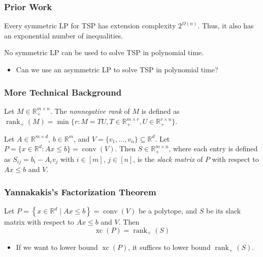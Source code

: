 \documentclass{beamer}
\newcommand{\nrank}{\operatorname{rank}_+}
\newcommand{\conv}{\operatorname{conv}}
\newcommand{\xc}{\operatorname{xc}}
\renewcommand{\R}{\mathbb{R}}
\begin{document}
\begin{frame}
\frametitle{Prior Work}

\pause
\begin{theorem}[Yannakakis, '91]
Every symmetric LP for TSP has extension complexity $2^{\Omega(n)}$. Thus, it also has an exponential number of inequalities.
\end{theorem}

\pause
\begin{corollary}
No symmetric LP can be used to solve TSP in polynomial time.
\end{corollary}

\pause
\begin{itemize}
\item Can we use an asymmetric LP to solve TSP in polynomial time?
\end{itemize}

\end{frame}


\begin{frame}
\frametitle{More Technical Background}

\pause
\begin{definition}
Let $M \in \R_+^{m \times n}$. The \emph{nonnegative rank} of $M$ is defined as $\nrank(M) = \min\{r : M = TU, T \in \R_+^{m \times r}, U \in \R_+^{r \times n}\}$.
\end{definition}

\pause
\begin{definition}
Let $A \in \R^{m \times d}$, $b \in \R^m$, and $V = \{v_1, \ldots, v_n\} \subseteq \R^d$. Let $P = \{x \in \R^d : Ax \le b\} = \conv(V)$. Then $S \in \R_+^{m\times n}$, where each entry is defined as $S_{ij} = b_i - A_i v_j$ with $i \in [m]$, $j \in [n]$, is the \emph{slack matrix} of $P$ with respect to $Ax \le b$ and $V$.
\end{definition}

\end{frame}


\begin{frame}
\frametitle{Yannakakis's Factorization Theorem}

\pause
\begin{theorem}
Let $P = \left\{ x \in \R^d \mid Ax \leq b \right\} = \conv(V)$ be a polytope, and $S$ be its slack matrix with respect to $Ax \leq b$ and $V$. Then
\[
\xc(P) = \nrank(S)
\]
\end{theorem}

\pause
\begin{itemize}
\item If we want to lower bound $\xc(P)$, it suffices to lower bound $\nrank(S)$.
\end{itemize}

\end{frame}
\end{document}
